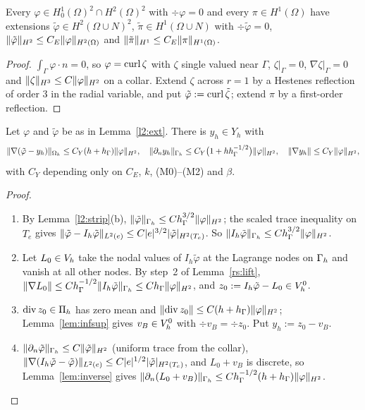 \begin{lemma}\label{l2:ext}
Every $\varphi\in H^1_0(\Omega)^2\cap H^2(\Omega)^2$ with $\div\varphi=0$ and every $\pi\in H^1(\Omega)$ have extensions $\tilde\varphi\in H^2(\Omega\cup N)^2$, $\tilde\pi\in H^1(\Omega\cup N)$ with $\div\tilde\varphi=0$, $\lVert \tilde\varphi\rVert_{H^2}\le C_E\lVert \varphi\rVert_{H^2(\Omega)}$ and $\lVert \tilde\pi\rVert_{H^1}\le C_E\lVert \pi\rVert_{H^1(\Omega)}$.
\end{lemma}

\begin{proof}
$\int_\Gamma\varphi\cdot n=0$, so $\varphi=\operatorname{curl}\zeta$ with $\zeta$ single valued near $\Gamma$, $\zeta|_\Gamma=0$, $\nabla\zeta|_\Gamma=0$ and $\lVert \zeta\rVert_{H^3}\le C\lVert \varphi\rVert_{H^2}$ on a collar. Extend $\zeta$ across $r=1$ by a Hestenes reflection of order $3$ in the radial variable, and put $\tilde\varphi:=\operatorname{curl}\tilde\zeta$; extend $\pi$ by a first-order reflection.
\end{proof}

\begin{lemma}[Approximation in $Y_h$]\label{l2:Y}
Let $\varphi$ and $\tilde\varphi$ be as in Lemma~\ref{l2:ext}. There is $y_h\in Y_h$ with
\[
\lVert \nabla(\tilde\varphi-y_h)\rVert_{\Omega_h}\le C_Y(h+h_\Gamma)\lVert \varphi\rVert_{H^2},\quad
\lVert \partial_n y_h\rVert_{\Gamma_h}\le C_Y\bigl(1+hh_\Gamma^{-1/2}\bigr)\lVert \varphi\rVert_{H^2},\quad
\lVert \nabla y_h\rVert\le C_Y\lVert \varphi\rVert_{H^2},
\]
with $C_Y$ depending only on $C_E$, $k$, (M0)--(M2) and $\beta$.
\end{lemma}

\begin{proof}
\begin{enumerate}
\item By Lemma~\ref{l2:strip}(b), $\lVert \tilde\varphi\rVert_{\Gamma_h}\le Ch_\Gamma^{3/2}\lVert \varphi\rVert_{H^2}$; the scaled trace inequality on $T_e$ gives $\lVert \tilde\varphi-I_h\tilde\varphi\rVert_{L^2(e)}\le C|e|^{3/2}|\tilde\varphi|_{H^2(T_e)}$. So $\lVert I_h\tilde\varphi\rVert_{\Gamma_h}\le Ch_\Gamma^{3/2}\lVert \varphi\rVert_{H^2}$.
\item Let $L_0\in V_h$ take the nodal values of $I_h\tilde\varphi$ at the Lagrange nodes on $\Gamma_h$ and vanish at all other nodes. By step~2 of Lemma~\ref{rs:lift}, $\lVert \nabla L_0\rVert\le Ch_\Gamma^{-1/2}\lVert I_h\tilde\varphi\rVert_{\Gamma_h}\le Ch_\Gamma\lVert \varphi\rVert_{H^2}$, and $z_0:=I_h\tilde\varphi-L_0\in V_h^0$.
\item $\operatorname{div} z_0\in\Pi_h$ has zero mean and $\lVert \operatorname{div} z_0\rVert\le C(h+h_\Gamma)\lVert \varphi\rVert_{H^2}$; Lemma~\ref{lem:infsup} gives $v_B\in V_h^0$ with $\div v_B=\div z_0$. Put $y_h:=z_0-v_B$.
\item $\lVert \partial_n\tilde\varphi\rVert_{\Gamma_h}\le C\lVert \tilde\varphi\rVert_{H^2}$ (uniform trace from the collar), $\lVert \nabla(I_h\tilde\varphi-\tilde\varphi)\rVert_{L^2(e)}\le C|e|^{1/2}|\tilde\varphi|_{H^2(T_e)}$, and $L_0+v_B$ is discrete, so Lemma~\ref{lem:inverse} gives $\lVert \partial_n(L_0+v_B)\rVert_{\Gamma_h}\le Ch_\Gamma^{-1/2}(h+h_\Gamma)\lVert \varphi\rVert_{H^2}$.\qedhere
\end{enumerate}
\end{proof}

